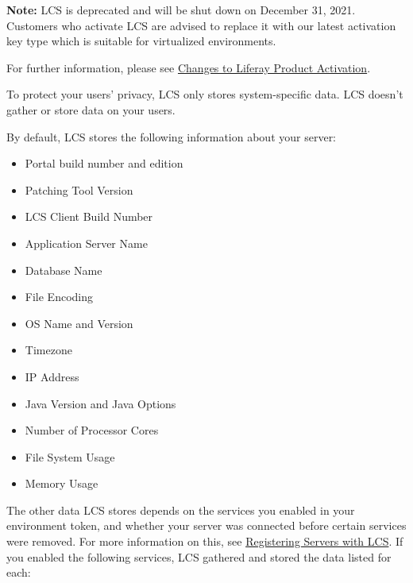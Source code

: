 \noindent\hrulefill

\textbf{Note:} LCS is deprecated and will be shut down on December 31,
2021. Customers who activate LCS are advised to replace it with our
latest activation key type which is suitable for virtualized
environments.

For further information, please see
\href{https://help.liferay.com/hc/en-us/articles/4402347960845-Changes-to-Liferay-Product-Activation}{Changes
to Liferay Product Activation}.

\noindent\hrulefill

To protect your users' privacy, LCS only stores system-specific data.
LCS doesn't gather or store data on your users.

By default, LCS stores the following information about your server:

\begin{itemize}
\tightlist
\item
  Portal build number and edition
\item
  Patching Tool Version
\item
  LCS Client Build Number
\item
  Application Server Name
\item
  Database Name
\item
  File Encoding
\item
  OS Name and Version
\item
  Timezone
\item
  IP Address
\item
  Java Version and Java Options
\item
  Number of Processor Cores
\item
  File System Usage
\item
  Memory Usage
\end{itemize}

The other data LCS stores depends on the services you enabled in your
environment token, and whether your server was connected before certain
services were removed. For more information on this, see
\href{/docs/7-2/deploy/-/knowledge_base/d/activating-your-liferay-dxp-server-with-lcs}{Registering
Servers with LCS}. If you enabled the following services, LCS gathered
and stored the data listed for each:

